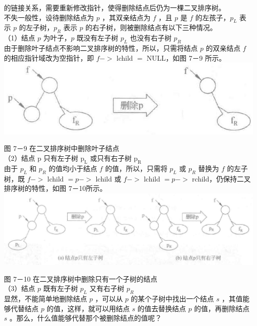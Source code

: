 \documentclass[10pt]{article}
\begin{document}
的链接关系，需要重新修改指针，使得删除结点后仍为一棵二叉排序树。\\
不失一般性，设待删除结点为 $p$ ，其双亲结点为 $f$ ，且 $p$ 是 $f$ 的左孩子，$p_{L}$ 表示 $p$ 的左子树，$p_{R}$ 表示 $p$ 的右子树，则被删除结点有以下三种情况。\\
（1）结点 $p$ 为叶子，$p$ 既没有左子树 $p_{L}$ 也没有右子树 $p_{R}$\\
由于删除叶子结点不影响二叉排序树的特性，所以，只需将结点 $p$ 的双亲结点 $f$ 的相应指针域改为空指针，即 $f->$ lchild $=$ NULL，如图 7－9 所示。\\
\includegraphics[max width=\textwidth, center]{2025_06_06_704745ea57b15b2333e5g-242}

图 7－9 在二叉排序树中删除叶子结点\\
（2）结点 p 只有左子树 $\mathrm{p}_{\mathrm{L}}$ 或只有右子树 $\mathrm{p}_{\mathrm{R}}$\\
由于 $p_{L}$ 和 $p_{R}$ 的值均小于结点 $f$ 的值，所以，只需将 $p_{L}$ 或 $p_{R}$ 替换为 $f$ 的左子树，既 $f->$ lchild $=p->$ lchild 或 $f->$ lchild $=p->$ rchild，仍保持二叉排序树的特性，如图 7－10所示。\\
\includegraphics[max width=\textwidth, center]{2025_06_06_704745ea57b15b2333e5g-242(1)}

图 7－10 在二叉排序树中删除只有一个子树的结点\\
（3）结点 $p$ 既有左子树 $p_{L}$ 又有右子树 $p_{R}$\\
显然，不能简单地删除结点 $p$ ，可以从 $p$ 的某个子树中找出一个结点 $s$ ，其值能够代替结点 $p$ 的值，这样，就可以用结点 $s$ 的值去替换结点 $p$ 的值，再删除结点 $s$ 。那么，什么值能够代替那个被删除结点的值呢？
\end{document}
